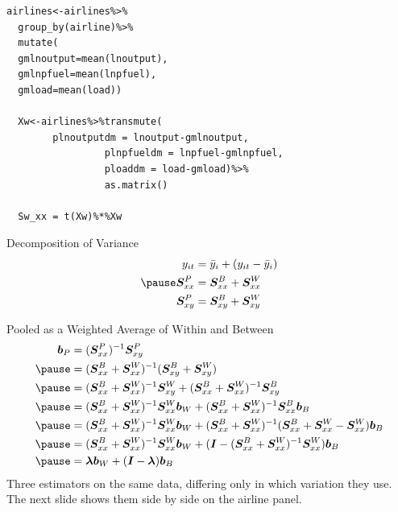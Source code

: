 \documentclass[aspectratio=169, handout]{beamer}
\numberwithin{equation}{section}
\begin{document}
\begin{frame}[fragile]
  \begin{lstlisting}
airlines<-airlines%>%
  group_by(airline)%>%
  mutate(
  gmlnoutput=mean(lnoutput),
  gmlnpfuel=mean(lnpfuel),
  gmload=mean(load))
  
  Xw<-airlines%>%transmute(
  		plnoutputdm = lnoutput-gmlnoutput, 
                 plnpfueldm = lnpfuel-gmlnpfuel,
                 ploaddm = load-gmload)%>%
                 as.matrix()
                     
  Sw_xx = t(Xw)%*%Xw
  \end{lstlisting}
\end{frame}

\begin{frame}{Decomposition of Variance}
\begin{align*}
y_{it}&=\bar{y}_i+(y_{it}-\bar{y}_i)\\\pause
\bm{S}^P_{xx}&=\bm{S}^B_{xx}+\bm{S}^W_{xx}\\
\bm{S}^P_{xy}&=\bm{S}^B_{xy}+\bm{S}^W_{xy}
\end{align*}
\end{frame}


\begin{frame}{Pooled as a Weighted Average of Within and Between}\begin{align*}
\bm{b}_P&=(\bm{S}^P_{xx})^{-1}\bm{S}^P_{xy}\\\pause
&=(\bm{S}^B_{xx}+\bm{S}^W_{xx})^{-1}(\bm{S}^B_{xy}+\bm{S}^W_{xy})\\\pause
&=(\bm{S}^B_{xx}+\bm{S}^W_{xx})^{-1}\bm{S}^W_{xy}+(\bm{S}^B_{xx}+\bm{S}^W_{xx})^{-1}\bm{S}^B_{xy}\\\pause
&=(\bm{S}^B_{xx}+\bm{S}^W_{xx})^{-1}\bm{S}^W_{xx}\bm{b}_W+(\bm{S}^B_{xx}+\bm{S}^W_{xx})^{-1}\bm{S}^B_{xx}\bm{b}_B\\\pause
&=(\bm{S}^B_{xx}+\bm{S}^W_{xx})^{-1}\bm{S}^W_{xx}\bm{b}_W+(\bm{S}^B_{xx}+\bm{S}^W_{xx})^{-1}(\bm{S}^B_{xx}+\bm{S}^W_{xx}-\bm{S}^W_{xx})\bm{b}_B\\\pause
&=(\bm{S}^B_{xx}+\bm{S}^W_{xx})^{-1}\bm{S}^W_{xx}\bm{b}_W+(\bm{I}-(\bm{S}^B_{xx}+\bm{S}^W_{xx})^{-1}\bm{S}^{W}_{xx})\bm{b}_B\\\pause
&=\bm{\lambda}\bm{b}_W+(\bm{I}-\bm{\lambda})\bm{b}_B\\
\end{align*}
{\small Three estimators on the same data, differing only in which variation they use. The next slide shows them side by side on the airline panel.}
\end{frame}
\end{document}
